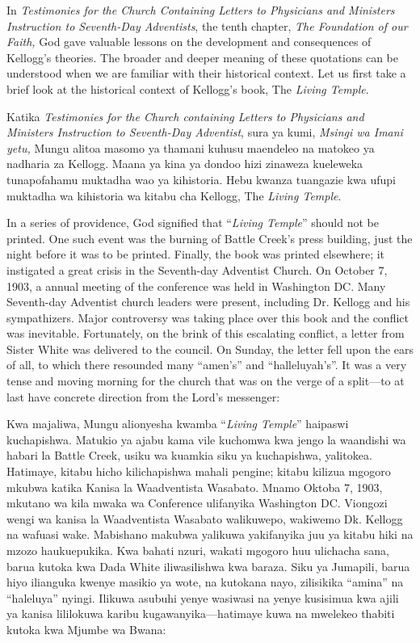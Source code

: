 



In \textit{Testimonies for the Church Containing Letters to Physicians and Ministers Instruction to Seventh-Day Adventists}, the tenth chapter, \textit{The Foundation of our Faith,} God gave valuable lessons on the development and consequences of Kellogg's theories. The broader and deeper meaning of these quotations can be understood when we are familiar with their historical context. Let us first take a brief look at the historical context of Kellogg's book, The \textit{Living Temple}.


Katika \textit{Testimonies for the Church containing Letters to Physicians and Ministers Instruction to Seventh-Day Adventist}, sura ya kumi, \textit{Msingi wa Imani yetu,} Mungu alitoa masomo ya thamani kuhusu maendeleo na matokeo ya nadharia za Kellogg. Maana ya kina ya dondoo hizi zinaweza kueleweka tunapofahamu muktadha wao ya kihistoria. Hebu kwanza tuangazie kwa ufupi muktadha wa kihistoria wa kitabu cha Kellogg, The \textit{Living Temple}.


In a series of providence, God signified that “\textit{Living Temple}” should not be printed. One such event was the burning of Battle Creek's press building, just the night before it was to be printed. Finally, the book was printed elsewhere; it instigated a great crisis in the Seventh-day Adventist Church. On October 7, 1903, a annual meeting of the conference was held in Washington DC. Many Seventh-day Adventist church leaders were present, including Dr. Kellogg and his sympathizers. Major controversy was taking place over this book and the conflict was inevitable. Fortunately, on the brink of this escalating conflict, a letter from Sister White was delivered to the council. On Sunday, the letter fell upon the ears of all, to which there resounded many “amen's” and “halleluyah's”. It was a very tense and moving morning for the church that was on the verge of a split—to at last have concrete direction from the Lord's messenger:


Kwa majaliwa, Mungu alionyesha kwamba “\textit{Living Temple}” haipaswi kuchapishwa. Matukio ya ajabu kama vile kuchomwa kwa jengo la waandishi wa habari la Battle Creek, usiku wa kuamkia siku ya kuchapishwa, yalitokea. Hatimaye, kitabu hicho kilichapishwa mahali pengine; kitabu kilizua mgogoro mkubwa katika Kanisa la Waadventista Wasabato. Mnamo Oktoba 7, 1903, mkutano wa kila mwaka wa Conference ulifanyika Washington DC. Viongozi wengi wa kanisa la Waadventista Wasabato walikuwepo, wakiwemo Dk. Kellogg na wafuasi wake. Mabishano makubwa yalikuwa yakifanyika juu ya kitabu hiki na mzozo haukuepukika. Kwa bahati nzuri, wakati mgogoro huu ulichacha sana, barua kutoka kwa Dada White iliwasilishwa kwa baraza. Siku ya Jumapili, barua hiyo ilianguka kwenye masikio ya wote, na kutokana nayo, zilisikika “amina” na “haleluya” nyingi. Ilikuwa asubuhi yenye wasiwasi na yenye kusisimua kwa ajili ya kanisa lililokuwa karibu kugawanyika—hatimaye kuwa na mwelekeo thabiti kutoka kwa Mjumbe wa Bwana:


